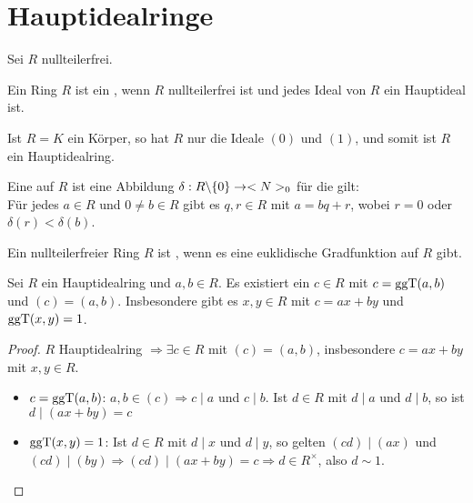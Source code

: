\section{Hauptidealringe}

Sei $R$ nullteilerfrei.

\begin{definition}[Hauptidealring]
	Ein Ring $R$ ist ein , wenn $R$ nullteilerfrei ist und jedes Ideal von $R$ ein Hauptideal ist.
\end{definition}

\begin{example}
	Ist $R=K$ ein Körper, so hat $R$ nur die Ideale $(0)$ und $(1)$, und somit ist $R$ ein Hauptidealring.
\end{example}

\begin{definition}
	Eine  auf $R$ ist eine Abbildung $\delta:R\backslash \{0\}\to <N>_0$ für die gilt: \\
	Für jedes $a\in R$ und $0\neq b\in R$ gibt es $q,r\in R$ mit $a=bq+r$, wobei $r=0$ oder $\delta(r)<\delta(b)$.
	
	Ein nullteilerfreier Ring $R$ ist , wenn es eine euklidische Gradfunktion auf $R$ gibt.
\end{definition}

\begin{lemma}
	Sei $R$ ein Hauptidealring und $a,b\in R$. Es existiert ein $c\in R$ mit $c=\operatorname{ggT}(a,b)$ und $(c)=(a,b)$. Insbesondere gibt es $x,y\in R$ mit $c=ax+by$ und $\operatorname{ggT}(x,y)=1$.
\end{lemma}
\begin{proof}
	$R$ Hauptidealring $\Rightarrow\exists c\in R$ mit $(c)=(a,b)$, insbesondere $c=ax+by$ mit $x,y\in R$.
	\begin{itemize}
		\item $c=\operatorname{ggT}(a,b)$: $a,b\in (c)\Rightarrow c\mid a$ und $c\mid b$. Ist $d\in R$ mit $d\mid a$ und $d\mid b$, so ist $d\mid (ax+by)=c$
		\item $\operatorname{ggT}(x,y)=1$: Ist $d\in R$ mit $d\mid x$ und $d\mid y$, so gelten $(cd)\mid (ax)$ und $(cd)\mid (by)\Rightarrow (cd)\mid (ax+by)=c\Rightarrow d\in R^\times$, also $d\sim 1$.
	\end{itemize}
\end{proof}
